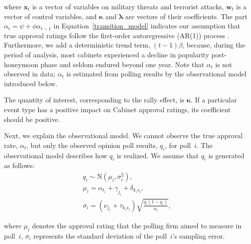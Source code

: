 \documentclass[letterpaper,12pt]{scrartcl}
\begin{document}
\noindent where $\bm{x}_{t}$ is a vector of variables on military threats and terrorist attacks, $\bm{w}_{t}$ is a vector of control variables, and $\bm{\kappa}$ and $\bm{\lambda}$ are vectors of their coefficients. The part $\alpha _{t}=\psi + \phi \alpha _{t-1}$ in Equation~\eqref{transition_model} indicates our assumption that true approval ratings follow the first-order autoregressive (AR(1)) process \citep{Pickup2007ElectStud,Pickup2008IntJForecast}. Furthermore, we add a deterministic trend term, $(t-1)\beta $, because, during the period of analysis, most cabinets experienced a decline in popularity post-honeymoon phase and seldom endured beyond one year. Note that $\alpha_{t}$ is not observed in data; $\alpha_{t}$ is estimated from polling results by the observational model introduced below.

The quantity of interest, corresponding to the rally effect, is $\bm{\kappa}$. If a particular event type has a positive impact on Cabinet approval ratings, its coefficient should be positive.

Next, we explain the observational model. We cannot observe the true approval rate, $\alpha _{t}$, but only the observed opinion poll results, $q_{i}$, for poll~$i$. The observational model describes how $q_{i}$ is realized. We assume that $q_{i}$ is generated as follows:
\begin{gather}
q_{i}\sim \mathrm{N}(\mu _{i},\sigma _{i}^{2}),\label{observational_model}\\
\mu _{i}=\alpha _{t_{i}}+\gamma _{j_{i}}+\delta _{k_{i}s_{i}},\label{house_mode_effects}\\
\sigma _{i}=(\nu _{j_{i}}+\tau _{k_{i}s_{i}})\sqrt{\frac{q_{i}(1-q_{i})}{n_{i}}},\label{design_effect}
\end{gather}

\noindent where $\mu _{i}$ denotes the approval rating that the polling firm aimed to measure in poll~$i$, $\sigma _{i}$ represents the standard deviation of the poll~$i$'s sampling error.
\end{document}
